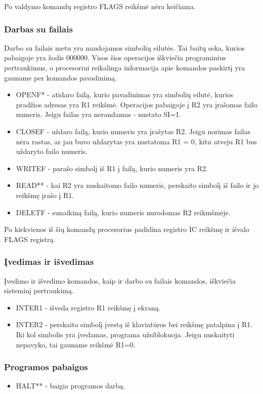 \documentclass{VUMIFInfKursinis}
\begin{document}
Po valdymo komandų registro FLAGS reikšmė nėra keičiama.

\subsubsection{Darbas su failais}
Darbo su failais metu yra naudojamos simbolių eilutės. Tai baitų seka, kurios pabaigoje yra žodis 000000. Visos šios operacijos iškviečia programinius pertraukimus, o procesoriui reikalinga informacija apie komandos paskirtį yra gauname per komandos pavadinimą.
\begin{itemize}
	\item OPENF* - atidaro failą, kurio pavadinimas yra simbolių eilutė, kurios pradžios adresas yra R1 reikšmė. Operacijos pabaigoje į R2 yra įrašomas failo numeris. Jeigu failas yra nerandamas - nustato SI=1.
	\item CLOSEF - uždaro failą, kurio numeris yra įrašytas  R2. Jeigu norimas failas nėra rastas, ar jau buvo uždarytas yra nustatoma R1 = 0, kitu atveju R1 bus uždaryto failo numeris.
	\item WRITEF - parašo simbolį iš R1 į failą, kurio numeris yra R2.
	\item READ** - kai R2 yra nuskaitomo failo numeris, perskaito simbolį iš failo ir jo reikšmę įrašo į R1.
	\item DELETF - sunaikiną failą, kurio numeris nurodomas R2 reikmšmėje.
\end{itemize}

Po kiekvienos iš šių komandų procesorius padidina registro IC reikšmę ir išvalo FLAGS registrą.

\subsubsection{Įvedimas ir išvedimas}
Įvedimo ir išvedimo komandos, kaip ir darbo su failais komandos, iškviečia sisteminį pertraukimą.
\begin{itemize}
	\item INTER1 - išveda registro R1 reikšmę į ekraną.
	\item INTER2 - perskaito simbolį įvestą iš klaviatūros bei reikšmę patalpina į R1. Iki kol simbolis yra įvedamas, programa užsiblokuoja. Jeigu nuskaityti nepavyko, tai gauname reikšmė R1=0.
\end{itemize}

\subsubsection{Programos pabaigos}
\begin{itemize}
	\item HALT** - baigia programos darbą.
\end{itemize}
\end{document}
